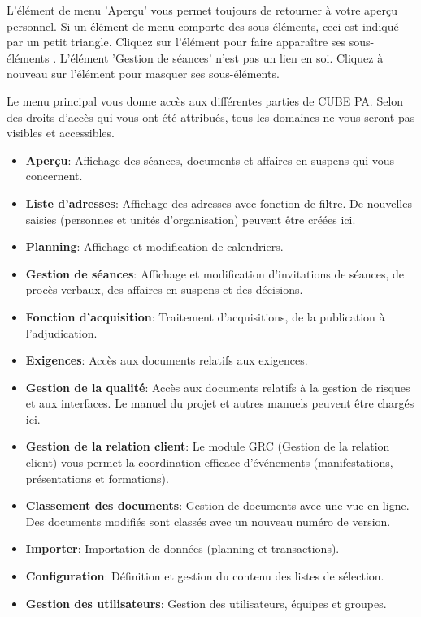 \vspace{\baselineskip}

L'élément de menu 'Aperçu'  vous permet toujours de retourner à votre aperçu personnel. Si un élément de menu comporte des sous-éléments, ceci est indiqué par un petit triangle. Cliquez sur l'élément pour faire apparaître ses sous-éléments . L'élément 'Gestion de séances' n'est pas un lien en soi. Cliquez à nouveau sur l'élément pour masquer ses sous-éléments.

\vspace{\baselineskip}

Le menu principal vous donne accès aux différentes parties de CUBE PA. Selon des droits d'accès qui vous ont été attribués, tous les domaines ne vous seront pas visibles et accessibles.

\begin{itemize}
\item
\textbf{Aperçu}: Affichage des séances, documents et affaires en suspens qui vous concernent.
\item
\textbf{Liste d'adresses}: Affichage des adresses avec fonction de filtre. De nouvelles saisies (personnes et unités d'organisation) peuvent être créées ici.
\item
\textbf{Planning}: Affichage et modification de calendriers.
\item
\textbf{Gestion de séances}: Affichage et modification d'invitations de séances, de procès-verbaux, des affaires en suspens et des 
décisions.
\item
\textbf{Fonction d'acquisition}: Traitement d'acquisitions, de la publication à l'adjudication.
\item
\textbf{Exigences}: Accès aux documents relatifs aux exigences.
\item
\textbf{Gestion de la qualité}: Accès aux documents relatifs à la gestion de risques et aux interfaces. Le manuel du projet et autres manuels peuvent être chargés ici.
\item
\textbf{Gestion de la relation client}: Le module GRC (Gestion de la relation client) vous permet la coordination efficace d’événements (manifestations, présentations et formations).
\item
\textbf{Classement des documents}: Gestion de documents avec une vue en ligne. Des documents modifiés sont classés avec un nouveau numéro de version.
\item
\textbf{Importer}: Importation de données (planning et transactions).
\item
\textbf{Configuration}: Définition et gestion du contenu des listes de sélection.
\item
\textbf{Gestion des utilisateurs}: Gestion des utilisateurs, équipes et groupes.
\end{itemize}

